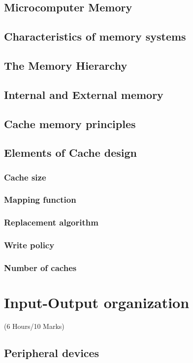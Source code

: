 \documentclass[12pt]{article}
\begin{document}
\subsection{Microcomputer Memory}
\subsection{Characteristics of memory systems}
\subsection{The Memory Hierarchy}
\subsection{Internal and External memory}
\subsection{Cache memory principles}
\subsection{Elements of Cache design}
\subsubsection{Cache size}
\subsubsection{Mapping function}
\subsubsection{Replacement algorithm}
\subsubsection{Write policy}
\subsubsection{Number of caches}

\pagebreak
\section{Input-Output organization}
\begin{center}(6 Hours/10 Marks)\end{center}
\subsection{Peripheral devices}
\end{document}
